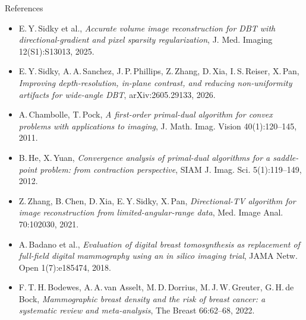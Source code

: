 \documentclass[aspectratio=169,xcolor=dvipsnames]{beamer}
\begin{document}
\begin{frame}{References}
  \footnotesize
  \begin{itemize}
    \item E.\,Y.\,Sidky et al., \emph{Accurate volume image reconstruction for
          DBT with directional-gradient and pixel sparsity regularization},
          J. Med. Imaging 12(S1):S13013, 2025.
    \item E.\,Y.\,Sidky, A.\,A.\,Sanchez, J.\,P.\,Phillips, Z.\,Zhang,
          D.\,Xia, I.\,S.\,Reiser, X.\,Pan, \emph{Improving
          depth-resolution, in-plane contrast, and reducing
          non-uniformity artifacts for wide-angle DBT},
          arXiv:2605.29133, 2026.
    \item A.\,Chambolle, T.\,Pock, \emph{A first-order primal-dual algorithm
          for convex problems with applications to imaging},
          J. Math. Imag. Vision 40(1):120--145, 2011.
    \item B.\,He, X.\,Yuan, \emph{Convergence analysis of primal-dual
          algorithms for a saddle-point problem: from contraction perspective},
          SIAM J. Imag. Sci. 5(1):119--149, 2012.
    \item Z.\,Zhang, B.\,Chen, D.\,Xia, E.\,Y.\,Sidky, X.\,Pan,
          \emph{Directional-TV algorithm for image reconstruction from
          limited-angular-range data}, Med. Image Anal. 70:102030, 2021.
    \item A.\,Badano et al., \emph{Evaluation of digital breast
          tomosynthesis as replacement of full-field digital mammography
          using an in silico imaging trial}, JAMA Netw. Open
          1(7):e185474, 2018.
    \item F.\,T.\,H.\,Bodewes, A.\,A.\,van Asselt, M.\,D.\,Dorrius,
          M.\,J.\,W.\,Greuter, G.\,H.\,de Bock, \emph{Mammographic
          breast density and the risk of breast cancer: a systematic
          review and meta-analysis}, The Breast 66:62--68, 2022.
  \end{itemize}
\end{frame}
\end{document}
